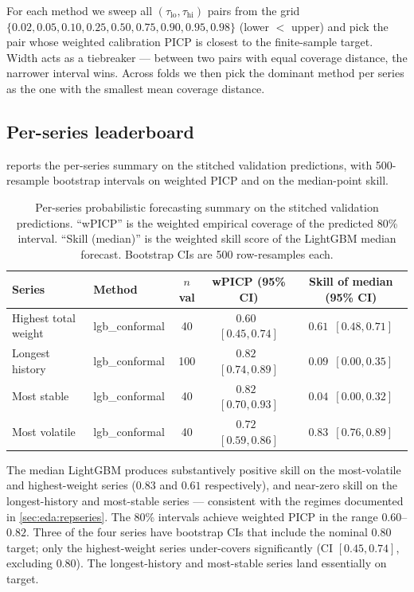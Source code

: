 For each method we sweep all $(\tau_{\text{lo}}, \tau_{\text{hi}})$ pairs from the grid $\{0.02, 0.05, 0.10, 0.25, 0.50, 0.75, 0.90, 0.95, 0.98\}$ (lower $<$ upper) and pick the pair whose weighted calibration PICP is closest to the finite-sample target. Width acts as a tiebreaker --- between two pairs with equal coverage distance, the narrower interval wins. Across folds we then pick the dominant method per series as the one with the smallest mean coverage distance.

\subsection{Per-series leaderboard}
\label{sec:quantile:leaderboard}

 reports the per-series summary on the stitched validation predictions, with 500-resample bootstrap intervals on weighted PICP and on the median-point skill.

\begin{table}[h]
\centering
\caption{Per-series probabilistic forecasting summary on the stitched validation predictions. ``wPICP'' is the weighted empirical coverage of the predicted 80\% interval. ``Skill (median)'' is the weighted skill score of the LightGBM median forecast. Bootstrap CIs are 500 row-resamples each.}
\label{tab:quantile_leaderboard}
\begin{tabular}{l l c c c}
\toprule
Series & Method & $n$ val & wPICP (95\% CI) & Skill of median (95\% CI) \\
\midrule
Highest total weight & lgb\_conformal & 40  & $0.60$ \,$[0.45, 0.74]$ & $\mathbf{0.61}$ \,$[0.48, 0.71]$ \\
Longest history      & lgb\_conformal & 100 & $0.82$ \,$[0.74, 0.89]$ & $0.09$ \,$[0.00, 0.35]$ \\
Most stable          & lgb\_conformal & 40  & $0.82$ \,$[0.70, 0.93]$ & $0.04$ \,$[0.00, 0.32]$ \\
Most volatile        & lgb\_conformal & 40  & $0.72$ \,$[0.59, 0.86]$ & $\mathbf{0.83}$ \,$[0.76, 0.89]$ \\
\bottomrule
\end{tabular}
\end{table}

The median LightGBM produces substantively positive skill on the most-volatile and highest-weight series ($0.83$ and $0.61$ respectively), and near-zero skill on the longest-history and most-stable series --- consistent with the regimes documented in \cref{sec:eda:repseries}. The 80\% intervals achieve weighted PICP in the range $0.60$--$0.82$. Three of the four series have bootstrap CIs that include the nominal $0.80$ target; only the highest-weight series under-covers significantly (CI $[0.45, 0.74]$, excluding $0.80$). The longest-history and most-stable series land essentially on target.

